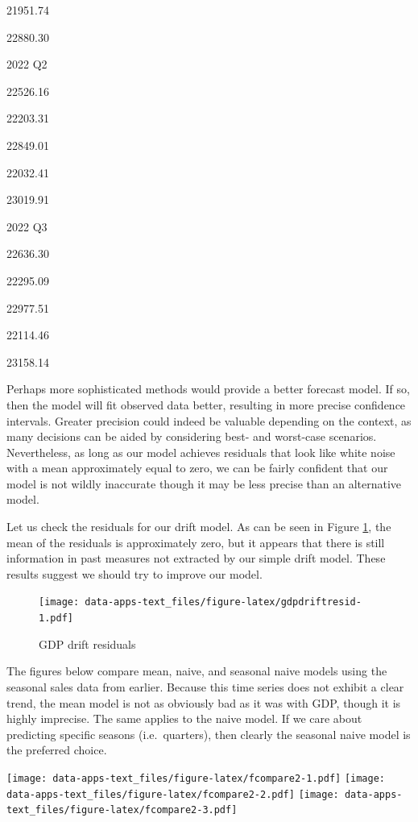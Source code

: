 \documentclass[
]{book}
\begin{document}
21951.74

22880.30

2022 Q2

22526.16

22203.31

22849.01

22032.41

23019.91

2022 Q3

22636.30

22295.09

22977.51

22114.46

23158.14

Perhaps more sophisticated methods would provide a better forecast model. If so, then the model will fit observed data better, resulting in more precise confidence intervals. Greater precision could indeed be valuable depending on the context, as many decisions can be aided by considering best- and worst-case scenarios. Nevertheless, as long as our model achieves residuals that look like white noise with a mean approximately equal to zero, we can be fairly confident that our model is not wildly inaccurate though it may be less precise than an alternative model.

Let us check the residuals for our drift model. As can be seen in Figure \ref{fig:gdpdriftresid}, the mean of the residuals is approximately zero, but it appears that there is still information in past measures not extracted by our simple drift model. These results suggest we should try to improve our model.

\begin{figure}
\centering
\texttt{[image: data-apps-text\_files/figure-latex/gdpdriftresid-1.pdf]}
\caption{\label{fig:gdpdriftresid}GDP drift residuals}
\end{figure}

The figures below compare mean, naive, and seasonal naive models using the seasonal sales data from earlier. Because this time series does not exhibit a clear trend, the mean model is not as obviously bad as it was with GDP, though it is highly imprecise. The same applies to the naive model. If we care about predicting specific seasons (i.e.~quarters), then clearly the seasonal naive model is the preferred choice.

\texttt{[image: data-apps-text\_files/figure-latex/fcompare2-1.pdf]} \texttt{[image: data-apps-text\_files/figure-latex/fcompare2-2.pdf]} \texttt{[image: data-apps-text\_files/figure-latex/fcompare2-3.pdf]}
\end{document}
